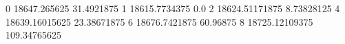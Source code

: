 0 18647.265625 31.4921875
1 18615.7734375 0.0
2 18624.51171875 8.73828125
4 18639.16015625 23.38671875
6 18676.7421875 60.96875
8 18725.12109375 109.34765625
